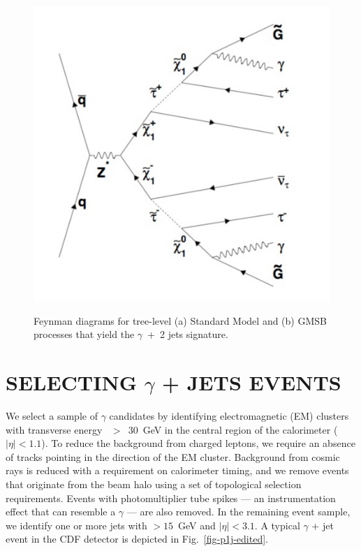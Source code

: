\documentclass[slac_one]{revtex4}
\begin{document}
\begin{figure}[h!]
{\includegraphics[scale=0.28]{gmsb_2.pdf}}
\caption{Feynman diagrams for tree-level (a) Standard Model and (b) GMSB processes that yield the $\gamma$~+~2 jets signature.}
\end{figure}

\section{SELECTING $\gamma$ + JETS EVENTS}
We select a sample of $\gamma$ candidates by identifying electromagnetic (EM) clusters with transverse energy
\et~$>$~30~GeV in the central region of the calorimeter ($|\eta|<1.1$).  To reduce the background from charged leptons, we require an absence of tracks pointing in the direction of the EM cluster.   Background from cosmic rays is reduced with a requirement on calorimeter timing, and we remove events that originate from the beam halo using a set of topological selection requirements.  Events with photomultiplier tube spikes --- an instrumentation effect that can resemble a $\gamma$ ---  are also removed. In the remaining event sample, we identify one or more jets with \mbox{\et$>15$ GeV} and $|\eta| < 3.1$. A typical $\gamma$ + jet event in the CDF detector is depicted in Fig.~\ref{fig-p1j-edited}.
\end{document}
